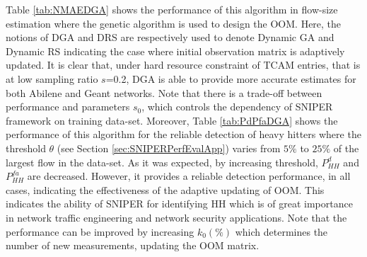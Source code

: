 Table \ref{tab:NMAEDGA} shows the performance of this algorithm in flow-size estimation where the genetic algorithm is used to design the OOM. Here, the notions of DGA and DRS are respectively used to denote Dynamic GA and Dynamic RS indicating the case where initial observation matrix is adaptively updated. It is clear that, under hard resource constraint of TCAM entries, that is at low sampling ratio $s$=0.2, DGA is able to provide more accurate estimates for both Abilene and Geant networks. Note that there is a trade-off between performance and parameters $s_{0}$, which controls the dependency of SNIPER framework on training data-set. Moreover, Table \ref{tab:PdPfaDGA} shows the performance of this algorithm for the reliable detection of heavy hitters where the threshold $\theta$ (see Section \ref{sec:SNIPERPerfEvalApp}) varies from $5\%$ to $25\%$ of the largest flow in the data-set. As it was expected, by increasing threshold, $P^{d}_{HH}$ and $P^{fa}_{HH}$ are decreased. However, it provides a reliable detection performance, in all cases, indicating the effectiveness of the adaptive updating of OOM. This indicates the ability of SNIPER for identifying HH which is of great importance in network traffic engineering and network security applications. Note that the performance can be improved by increasing $k_{0}(\%)$ which determines the number of new measurements, updating the OOM matrix.
%
%
